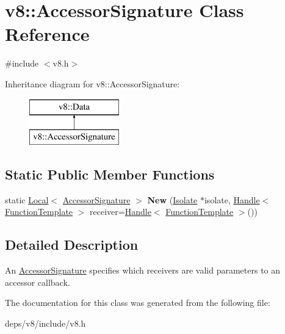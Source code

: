 \hypertarget{classv8_1_1_accessor_signature}{}\section{v8\+:\+:Accessor\+Signature Class Reference}
\label{classv8_1_1_accessor_signature}


{\ttfamily \#include $<$v8.\+h$>$}

Inheritance diagram for v8\+:\+:Accessor\+Signature\+:\begin{figure}[H]
\begin{center}
\leavevmode
\includegraphics[height=2.000000cm]{classv8_1_1_accessor_signature}
\end{center}
\end{figure}
\subsection*{Static Public Member Functions}
\begin{DoxyCompactItemize}
\item 
\hypertarget{classv8_1_1_accessor_signature_a608c489295009cf8c343c1099559b1cf}{}static \hyperlink{classv8_1_1_local}{Local}$<$ \hyperlink{classv8_1_1_accessor_signature}{Accessor\+Signature} $>$ {\bfseries New} (\hyperlink{classv8_1_1_isolate}{Isolate} $\ast$isolate, \hyperlink{classv8_1_1_handle}{Handle}$<$ \hyperlink{classv8_1_1_function_template}{Function\+Template} $>$ receiver=\hyperlink{classv8_1_1_handle}{Handle}$<$ \hyperlink{classv8_1_1_function_template}{Function\+Template} $>$())\label{classv8_1_1_accessor_signature_a608c489295009cf8c343c1099559b1cf}

\end{DoxyCompactItemize}


\subsection{Detailed Description}
An \hyperlink{classv8_1_1_accessor_signature}{Accessor\+Signature} specifies which receivers are valid parameters to an accessor callback. 

The documentation for this class was generated from the following file\+:\begin{DoxyCompactItemize}
\item 
deps/v8/include/v8.\+h\end{DoxyCompactItemize}
